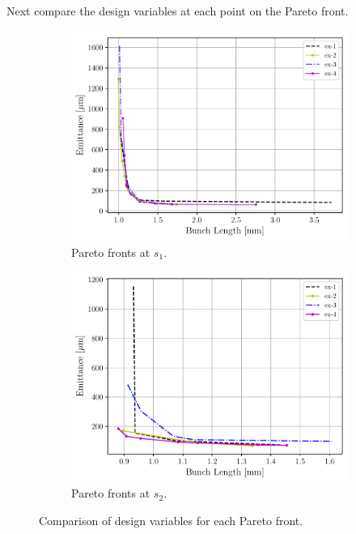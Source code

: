 Next compare the design variables at each point on the 
Pareto front.
\begin{figure}
	\centering
	\begin{subfigure}{1\textwidth}
		\centering
		\includegraphics[width=\textwidth]{Report/ex-pareto1}
		\caption{Pareto fronts at $s_1$.}
		\label{bounds1}
	\end{subfigure}
	\begin{subfigure}{1\textwidth}
		\centering
		\includegraphics[width=\textwidth]{Report/ex-pareto2}
		\caption{Pareto fronts at $s_2$.}
		\label{bounds2}
	\end{subfigure}
	\caption{Comparison of design variables for each Pareto front.}
	\label{bounds}
\end{figure}


 






